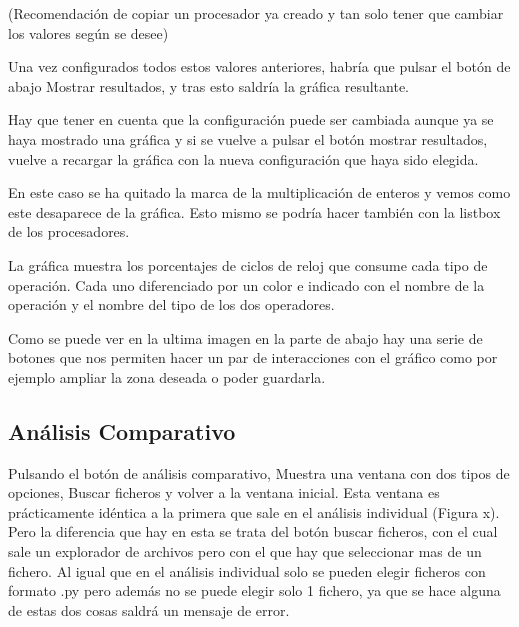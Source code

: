 (Recomendación de copiar un procesador ya creado y tan solo tener que cambiar los valores según se desee)\\


Una vez configurados todos estos valores anteriores, habría que pulsar el botón de abajo Mostrar resultados, y tras esto saldría la gráfica resultante.\\


Hay que tener en cuenta que la configuración puede ser cambiada aunque ya se haya mostrado una gráfica y si se vuelve a pulsar el botón mostrar resultados, vuelve a recargar la gráfica con la nueva configuración que haya sido elegida.\\


En este caso se ha quitado la marca de la multiplicación de enteros y vemos como este desaparece de la gráfica. Esto mismo se podría hacer también con la listbox de los procesadores.

La gráfica muestra los porcentajes de ciclos de reloj que consume cada tipo de operación. Cada uno diferenciado por un color e indicado con el nombre de la operación y el nombre del tipo de los dos operadores.

Como se puede ver en la ultima imagen en la parte de abajo hay una serie de botones que nos permiten hacer un par de interacciones con el gráfico como por ejemplo ampliar la zona deseada o poder guardarla.

\subsection{Análisis Comparativo}
Pulsando el botón de análisis comparativo, Muestra una ventana con dos tipos de opciones, Buscar ficheros y volver a la ventana inicial. Esta ventana es prácticamente idéntica a la primera que sale en el análisis individual (Figura x). Pero la diferencia que hay en esta se trata del botón buscar ficheros, con el cual sale un explorador de archivos pero con el que hay que seleccionar mas de un fichero. Al igual que en el análisis individual solo se pueden elegir ficheros con formato .py pero además no se puede elegir solo 1 fichero, ya que se hace alguna de estas dos cosas saldrá un mensaje de error.\\

